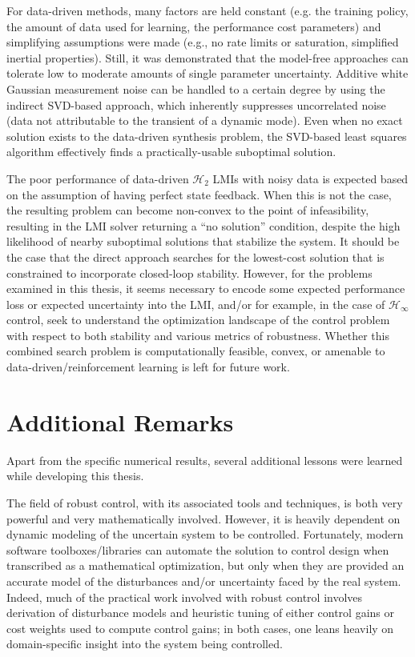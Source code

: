 For data-driven methods, many factors are held constant (e.g. the training policy, the amount of data used for learning, the performance cost parameters) and simplifying assumptions were made (e.g., no rate limits or saturation, simplified inertial properties).  Still, it was demonstrated that the model-free approaches can tolerate low to moderate amounts of single parameter uncertainty.  Additive white Gaussian measurement noise can be handled to a certain degree by using the indirect SVD-based approach, which inherently suppresses uncorrelated noise (data not attributable to the transient of a dynamic mode).  Even when no exact solution exists to the data-driven synthesis problem, the SVD-based least squares algorithm effectively finds a practically-usable suboptimal solution.

The poor performance of data-driven $\mathcal{H}_{2}$ LMIs with noisy data is expected based on the assumption of having perfect state feedback.  When this is not the case, the resulting problem can become non-convex to the point of infeasibility, resulting in the LMI solver returning a ``no solution'' condition, despite the high likelihood of nearby suboptimal solutions that stabilize the system.  It should be the case that the direct approach searches for the lowest-cost solution that is constrained to incorporate closed-loop stability.  However, for the problems examined in this thesis, it seems necessary to encode some expected performance loss or expected uncertainty into the LMI, and/or for example, in the case of $\mathcal{H}_{\infty}$ control, seek to understand the optimization landscape of the control problem with respect to both stability and various metrics of robustness.  Whether this combined search problem is computationally feasible, convex, or amenable to data-driven/reinforcement learning is left for future work.

\section{Additional Remarks}
Apart from the specific numerical results, several additional lessons were learned while developing this thesis.

The field of robust control, with its associated tools and techniques, is both very powerful and very mathematically involved.  However, it is heavily dependent on dynamic modeling of the uncertain system to be controlled.  Fortunately, modern software toolboxes/libraries can automate the solution to control design when transcribed as a mathematical optimization, but only when they are provided an accurate model of the disturbances and/or uncertainty faced by the real system.  Indeed, much of the practical work involved with robust control involves derivation of disturbance models and heuristic tuning of either control gains or cost weights used to compute control gains; in both cases, one leans heavily on domain-specific insight into the system being controlled.

